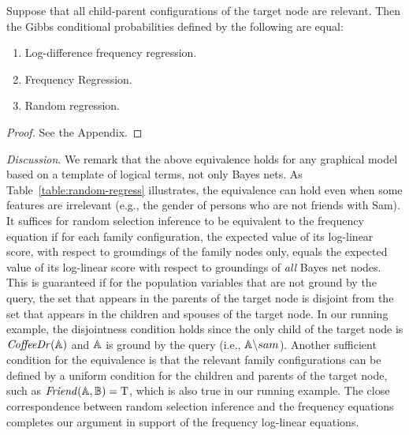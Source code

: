 \documentclass[twoside,11pt]{article}
\newcommand{\point}[1]{\noindent\emph{#1}.}
\begin{document}
\begin{theorem} \label{th:random-regress} Suppose that all child-parent configurations of the target node are relevant. Then the Gibbs conditional probabilities defined by the following are equal:

\begin{enumerate}
\item Log-difference frequency regression. 
\item Frequency Regression.
\item Random regression.
\end{enumerate}


\end{theorem}

\begin{proof} See the Appendix. %
\end{proof}

\point{Discussion}
We remark that the above equivalence holds for any graphical model based on a template of logical terms, not only Bayes nets. As Table~\ref{table:random-regress} illustrates, the equivalence can hold even when some features are irrelevant (e.g., the gender of persons who are not friends with Sam). It suffices for random selection inference to be equivalent to the frequency equation if for each family configuration, the expected value of its log-linear score, with respect to groundings of the family nodes only, equals the expected value of its log-linear score with respect to groundings of {\em all} Bayes net nodes. This is guaranteed if for the population variables that are not ground by the query, the set that appears in the parents of the target node is disjoint from the set that appears in the children and spouses of the target node. In our running example, the disjointness condition holds since the only child of the target node is $\it{CoffeeDr}(\mathbb{A})$ and $\mathbb{A}$ is ground by the query (i.e., $\mathbb{A} \backslash sam$). Another sufficient condition for the equivalence is that the relevant family configurations can be defined by a uniform condition for the children and parents of the target node, such as $\it{Friend}(\mathbb{A},\mathbb{B}) = \mathrm{T}$, which is also true in our running example. The close correspondence between random selection inference and the frequency equations completes our argument in support of the frequency log-linear equations. 
\end{document}
